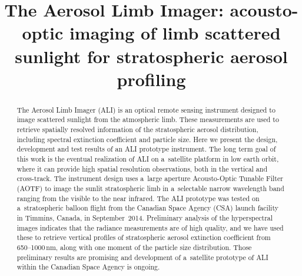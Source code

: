 \documentclass[amtd, online, hvmath]{copernicus}
\begin{document}
\hack{\sloppy}

\title{The Aerosol Limb Imager: acousto-optic imaging of limb scattered
sunlight for stratospheric aerosol profiling}







\published{}



\maketitle


\begin{abstract}
  The Aerosol Limb Imager (ALI) is an optical remote sensing
  instrument designed to image scattered sunlight from the atmospheric
  limb. These measurements are used to retrieve spatially resolved
  information of the stratospheric aerosol distribution, including
  spectral extinction coefficient and particle size. Here we present
  the design, development and test results of an ALI prototype
  instrument. The long term goal of this work is the eventual
  realization of ALI on a~satellite platform in low earth orbit, where
  it can provide high spatial resolution observations, both in the
  vertical and cross-track. The instrument design uses a~large
  aperture Acousto-Optic Tunable Filter (AOTF) to image the sunlit
  stratospheric limb in a~selectable narrow wavelength band ranging
  from the visible to the near infrared. The ALI prototype was tested
  on a~stratospheric balloon flight from the Canadian Space Agency
  (CSA) launch facility in Timmins, Canada, in
  September~2014. Preliminary analysis of the hyperspectral images
  indicates that the radiance measurements are of high quality, and we
  have used these to retrieve vertical profiles of stratospheric
  aerosol extinction coefficient from 650--1000\,\unit{nm}, along with
  one moment of the particle size distribution. Those preliminary
  results are promising and development of a~satellite prototype of
  ALI within the Canadian Space Agency is ongoing.
\end{abstract}
\end{document}
